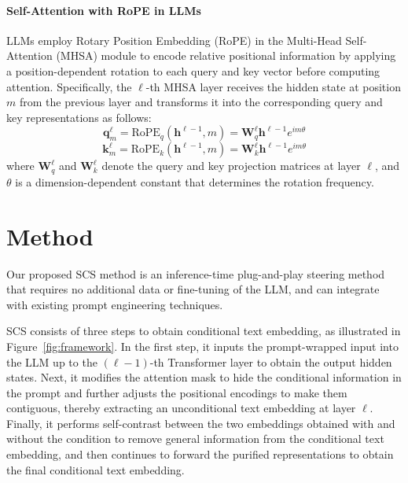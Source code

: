 \documentclass[11pt]{article}
\newcommand{\ours}{SCS }
\begin{document}
\paragraph{Self-Attention with RoPE in LLMs}
LLMs employ Rotary Position Embedding (RoPE) \cite{rope} in the Multi-Head Self-Attention (MHSA) module to encode relative positional information by applying a position-dependent rotation to each query and key vector before computing attention.
Specifically, the $\ell$-th MHSA layer receives the hidden state at position $m$ from the previous layer and transforms it into the corresponding query and key representations as follows:
\begin{equation}
\mathbf{q}^{\ell}_m = \text{RoPE}_q(\mathbf{h}^{\ell-1}, m) = \mathbf{W}_q^{\ell} \mathbf{h}^{\ell-1} e^{i m \theta}
\end{equation}
\begin{equation}
\mathbf{k}^{\ell}_m = \text{RoPE}_k(\mathbf{h}^{\ell-1}, m) = \mathbf{W}_k^{\ell} \mathbf{h}^{\ell-1} e^{i m \theta}
\end{equation}
where $\mathbf{W}_q^{\ell}$ and $\mathbf{W}_k^{\ell}$ denote the query and key projection matrices at layer $\ell$, and $\theta$ is a dimension-dependent constant that determines the rotation frequency.

\section{Method}
Our proposed \ours method is an inference-time plug-and-play steering method that requires no additional data or fine-tuning of the LLM, and can integrate with existing prompt engineering techniques.


\ours consists of three steps to obtain conditional text embedding, as illustrated in Figure~\ref{fig:framework}.
In the first step, it inputs the prompt-wrapped input into the LLM up to the $(\ell-1)$-th Transformer layer to obtain the output hidden states.
Next, it modifies the attention mask to hide the conditional information in the prompt and further adjusts the positional encodings to make them contiguous, thereby extracting an unconditional text embedding at layer $\ell$.
Finally, it performs self-contrast between the two embeddings obtained with and without the condition to remove general information from the conditional text embedding, and then continues to forward the purified representations to obtain the final conditional text embedding.
\end{document}
